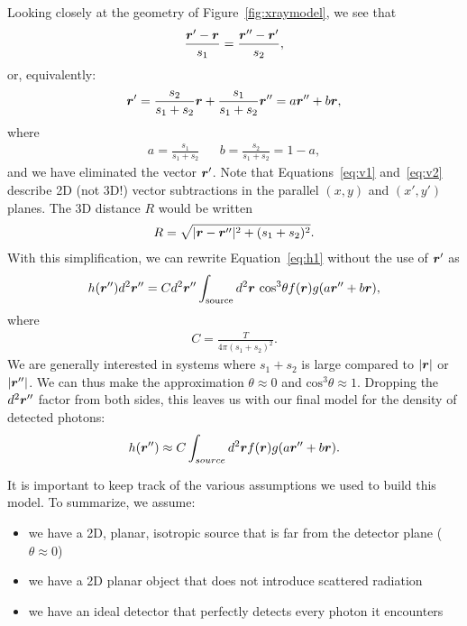 \documentclass[mphy386-notes.tex]{subfiles}
\begin{document}
Looking closely at the geometry of Figure~\ref{fig:xraymodel}, we
see that
\begin{align}
  \frac{\boldsymbol{r}'-\boldsymbol{r}}{s_1} = \frac{\boldsymbol{r}''-\boldsymbol{r}'}{s_2},
  \label{eq:v1}
\end{align}
or, equivalently:
\begin{align}
  \boldsymbol{r}' = \frac{s_2}{s_1 + s_2}\boldsymbol{r} + \frac{s_1}{s_1+s_2}\boldsymbol{r}'' = a\boldsymbol{r}'' + b\boldsymbol{r},
  \label{eq:v2}
\end{align}
where
\begin{align}
  a = \frac{s_1}{s_1+s_2} & & b = \frac{s_2}{s_1 + s_2} = 1 - a,
\end{align}
and we have eliminated the vector $\boldsymbol{r}'$. Note that Equations~\ref{eq:v1}
and~\ref{eq:v2} describe 2D (not 3D!) vector subtractions in the parallel $(x,y)$
and $(x',y')$ planes. The 3D distance $R$ would be written
\begin{align}
  R = \sqrt{|\boldsymbol{r}-\boldsymbol{r}''|^2 + (s_1+s_2)^2}.
\end{align}
With this simplification, we can rewrite Equation~\ref{eq:h1} without the use of $\boldsymbol{r}'$ as
\begin{align}
  h(\boldsymbol{r}'')d^2\boldsymbol{r}'' = Cd^2\boldsymbol{r}''\int_{\text{source}}d^2\boldsymbol{r} \text{ cos}^3\theta f(\boldsymbol{r})g(a\boldsymbol{r}'' + b\boldsymbol{r}),
\end{align}
where
\begin{align}
  C = \frac{T}{4\pi(s_1+s_2)^2}.
\end{align}
We are generally interested in systems where $s_1 + s_2$ is large compared to $|\boldsymbol{r}|$ or $|\boldsymbol{r}''|$. We
can thus make the approximation $\theta \approx 0$ and $\text{cos}^3\theta \approx 1$. Dropping the
$d^2\boldsymbol{r}''$ factor from both sides, this leaves us with our final model for the density of detected
photons:
\begin{align}
  h(\boldsymbol{r}'') \approx C\int_{source}d^2 \boldsymbol{r} f(\boldsymbol{r})g(a\boldsymbol{r}'' + b\boldsymbol{r}).
  \label{eq:hfinal}
\end{align}

It is important to keep track of the various assumptions we used to build this model.
To summarize, we assume:
\begin{itemize}
\item we have a 2D, planar, isotropic source that is far from the detector plane ($\theta\approx 0$)
\item we have a 2D planar object that does not introduce scattered radiation
\item we have an ideal detector that perfectly detects every photon it encounters
\end{itemize}
\end{document}
